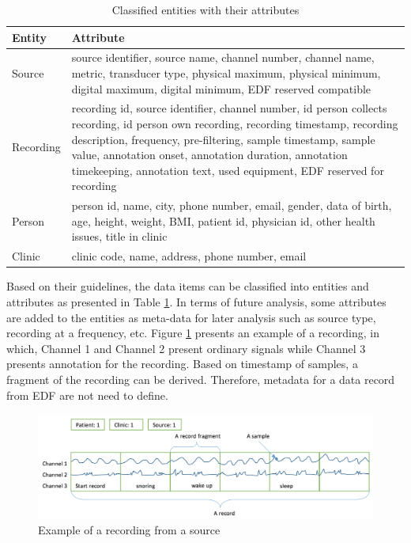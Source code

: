 \begin{table}[ht]
\begin{center}
\begin{tabular}{ |p{3cm}||p{10cm}|}
 \hline
 Entity& Attribute\\
 \hline
 Source& source identifier, source name, channel number, channel name, metric, transducer type, physical maximum, physical minimum, digital maximum, digital minimum, EDF reserved compatible\\
 \hline
 Recording& recording id, source identifier, channel number, id person collects recording, id person own recording, recording timestamp, recording description, frequency, pre-filtering, sample timestamp, sample value, annotation onset, annotation duration, annotation timekeeping, annotation text, used equipment, EDF reserved for recording\\
 \hline
 Person& person id, name, city, phone number, email, gender, data of birth, age, height, weight, BMI, patient id, physician id, other health issues, title in clinic\\
 \hline
 Clinic& clinic code, name, address, phone number, email\\
 \hline
\end{tabular}
\end{center}
\caption{Classified entities with their attributes}
\label{tab:entitiesAttributes}
\end{table}
Based on their guidelines, the data items can be classified into entities and attributes as presented in Table \ref{tab:entitiesAttributes}. In terms of future analysis, some attributes are added to the entities as meta-data for later analysis such as source type, recording at a frequency, etc. Figure \ref{fig:Figures/RecordingExample} presents an example of a recording, in which, Channel 1 and Channel 2 present ordinary signals while Channel 3 presents annotation for the recording. Based on timestamp of samples, a fragment of the recording can be derived. Therefore, metadata for a data record from EDF are not need to define.
\begin{figure}[ht]
    \centering
    \includegraphics[width=1.0\textwidth]{Figures/ARecord.png}
    \caption{Example of a recording from a source}
    \label{fig:Figures/RecordingExample}
\end{figure}
